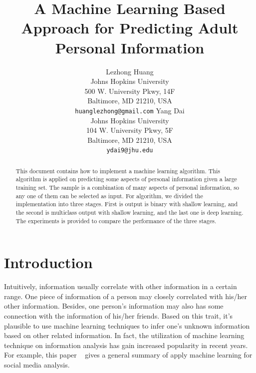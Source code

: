 \documentclass[11pt,letterpaper]{article}
\title{ A Machine Learning Based Approach for Predicting Adult Personal Information}
\author{Lezhong Huang\\
  Johns Hopkins University\\
  500 W. University Pkwy, 14F\\
  Baltimore, MD 21210, USA\\
  {\tt huanglezhong@gmail.com}
  \And
  Yang Dai \\
  Johns Hopkins University \\
  104 W. University Pkwy, 5F\\
  Baltimore, MD 21210, USA\\
  {\tt ydai9@jhu.edu}}
\date{}
\begin{document}
\maketitle
\begin{abstract}
This document contains how to implement a machine learning algorithm. This algorithm is applied on predicting some aspects of personal information given a large training set. The sample is a combination of many aspects of personal information, so any one of them can be selected as input. For algorithm, we divided the implementation into three stages. First is output is binary with shallow learning, and the second is multiclass output with shallow learning, and the last one is deep learning. The experiments is provided to compare the performance of the three stages.
\end{abstract}

\section{Introduction}
Intuitively, information usually correlate with other information in a certain range. One piece of information of a person may closely correlated with his/her other information. Besides, one person's information may also has some connection with the information of his/her friends. Based on this trait, it's plausible to use machine learning techniques to infer one's unknown information based on other related information. In fact, the utilization of machine learning technique on information analysis has gain increased popularity in recent years. For example, this paper ~\cite{Mel:00} gives a general summary of apply machine learning for social media analysis.
\end{document}
